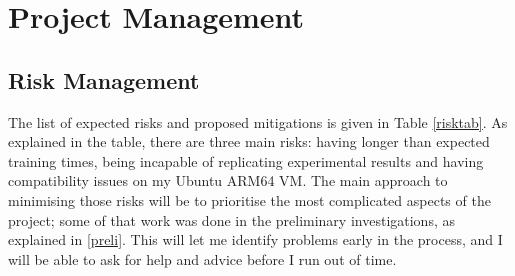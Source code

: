 
\chapter{Project Management} %

\label{Chapter5} %



\section{Risk Management}
\label{risman}

The list of expected risks and proposed mitigations is given in Table \ref{risktab}. As explained in the table, there are three main risks: having longer than expected training times, being incapable of replicating experimental results and having compatibility issues on my Ubuntu ARM64 VM. The main approach to minimising those risks will be to prioritise the most complicated aspects of the project; some of that work was done in the preliminary investigations, as explained in \ref{preli}. This will let me identify problems early in the process, and I will be able to ask for help and advice before I run out of time.

